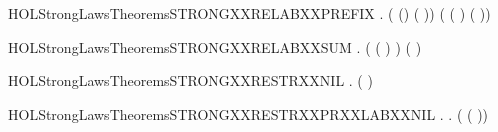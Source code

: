 \newcommand{\HOLStrongLawsTheoremsSTRONGXXRELABXXNIL}{\UseVerbatim{HOLStrongLawsTheoremsSTRONGXXRELABXXNIL}}
\begin{SaveVerbatim}{HOLStrongLawsTheoremsSTRONGXXRELABXXPREFIX}
\HOLTokenTurnstile{} \HOLSymConst{\HOLTokenForall{}}  .
        ( () ( ))
         ( ( )   ( ))
\end{SaveVerbatim}
\newcommand{\HOLStrongLawsTheoremsSTRONGXXRELABXXPREFIX}{\UseVerbatim{HOLStrongLawsTheoremsSTRONGXXRELABXXPREFIX}}
\begin{SaveVerbatim}{HOLStrongLawsTheoremsSTRONGXXRELABXXSUM}
\HOLTokenTurnstile{} \HOLSymConst{\HOLTokenForall{}}  .
        ( ( \HOLSymConst{\ensuremath{+}} ) )
         (   \HOLSymConst{\ensuremath{+}}   )
\end{SaveVerbatim}
\newcommand{\HOLStrongLawsTheoremsSTRONGXXRELABXXSUM}{\UseVerbatim{HOLStrongLawsTheoremsSTRONGXXRELABXXSUM}}
\begin{SaveVerbatim}{HOLStrongLawsTheoremsSTRONGXXRESTRXXNIL}
\HOLTokenTurnstile{} \HOLSymConst{\HOLTokenForall{}}.  (\HOLConst{\ensuremath{\nu}}  ) 
\end{SaveVerbatim}
\newcommand{\HOLStrongLawsTheoremsSTRONGXXRESTRXXNIL}{\UseVerbatim{HOLStrongLawsTheoremsSTRONGXXRESTRXXNIL}}
\begin{SaveVerbatim}{HOLStrongLawsTheoremsSTRONGXXRESTRXXPRXXLABXXNIL}
\HOLTokenTurnstile{} \HOLSymConst{\HOLTokenForall{}} .
        \HOLConst{\HOLTokenIn{}}  \HOLSymConst{\HOLTokenDisj{}}   \HOLConst{\HOLTokenIn{}}  \HOLSymConst{\HOLTokenImp{}}
       \HOLSymConst{\HOLTokenForall{}}.  (\HOLConst{\ensuremath{\nu}}  ( )) 
\end{SaveVerbatim}
\newcommand{\HOLStrongLawsTheoremsSTRONGXXRESTRXXPRXXLABXXNIL}{\UseVerbatim{HOLStrongLawsTheoremsSTRONGXXRESTRXXPRXXLABXXNIL}}
